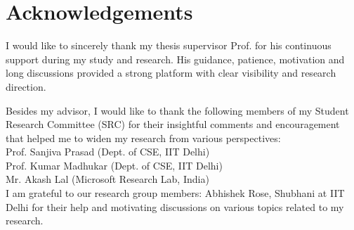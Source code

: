 \chapter*{Acknowledgements}
\setlength{\parindent}{0pt} 
\setlength{\parskip}{2ex}

\noindent I would like to sincerely thank my thesis supervisor Prof. \Guide{}
for his continuous support during my study and research.
His guidance, patience, motivation and long discussions provided a
strong platform with clear visibility and research direction.

\noindent Besides my advisor, I would like to thank the following members of
my Student Research Committee (SRC) for their insightful comments and encouragement
that helped me to widen my research from various perspectives: \\
Prof. Sanjiva Prasad (Dept. of CSE, IIT Delhi) \\
Prof. Kumar Madhukar (Dept. of CSE, IIT Delhi) \\
Mr. Akash Lal (Microsoft Research Lab, India) \\

\noindent I am grateful to our research group members: Abhishek Rose, Shubhani at IIT Delhi for
their help and motivating discussions on various topics related to my research.

\vspace{1cm}

\begin{flushright}
\noindent {\bfseries \Auth{}}
\end{flushright}
